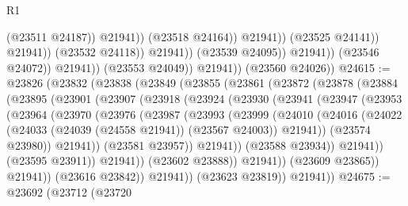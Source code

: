 \begin{lexlean}{R1}
\begin{coremodule}
                                                (@23511 @24187))
                                              @21941))
                                          (@23518 @24164))
                                        @21941))
                                    (@23525 @24141))
                                  @21941))
                              (@23532 @24118))
                            @21941))
                        (@23539 @24095))
                      @21941))
                  (@23546 @24072))
                @21941))
            (@23553 @24049))
          @21941))
      (@23560 @24026))
@24615 := @23826
    (@23832
      (@23838
        (@23849
          (@23855
            (@23861
              (@23872
                (@23878
                  (@23884
                    (@23895
                      (@23901
                        (@23907
                          (@23918
                            (@23924
                              (@23930
                                (@23941
                                  (@23947
                                    (@23953
                                      (@23964
                                        (@23970
                                          (@23976
                                            (@23987
                                              (@23993
                                                (@23999
                                                  (@24010
                                                    (@24016
                                                      (@24022
                                                        (@24033
                                                          (@24039 (@24558 @21941))
                                                          (@23567 @24003))
                                                        @21941))
                                                    (@23574 @23980))
                                                  @21941))
                                              (@23581 @23957))
                                            @21941))
                                        (@23588 @23934))
                                      @21941))
                                  (@23595 @23911))
                                @21941))
                            (@23602 @23888))
                          @21941))
                      (@23609 @23865))
                    @21941))
                (@23616 @23842))
              @21941))
          (@23623 @23819))
        @21941))
@24675 := @23692
    (@23712
      (@23720

\end{coremodule}
\end{lexlean}
